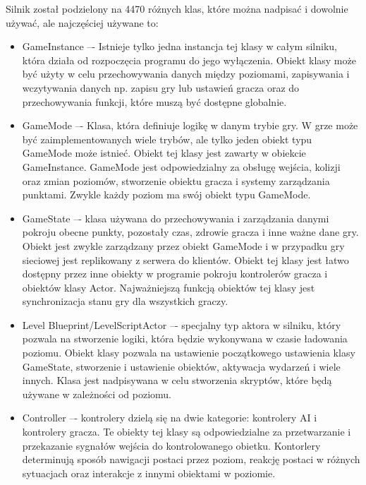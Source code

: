 \documentclass[12pt,twoside]{article}
\begin{document}
Silnik został podzielony na 4470 różnych klas, które można nadpisać i dowolnie
używać, ale najczęściej używane to:
\begin{itemize}
\item GameInstance –- Istnieje tylko jedna instancja tej klasy w całym silniku,
która działa od rozpoczęcia programu do jego wyłączenia. Obiekt klasy może być
użyty w celu przechowywania danych między poziomami, zapisywania i wczytywania
danych np. zapisu gry lub ustawień gracza oraz do przechowywania funkcji, które
muszą być dostępne globalnie.\cite{UE:GameInstance} 

\item GameMode –- Klasa, która definiuje logikę w danym trybie gry. W grze może
być zaimplementowanych wiele trybów, ale tylko jeden obiekt typu GameMode może
istnieć. Obiekt tej klasy jest zawarty w obiekcie GameInstance. GameMode jest
odpowiedzialny za obsługę wejścia, kolizji oraz zmian poziomów, stworzenie
obiektu gracza i systemy zarządzania punktami. Zwykle każdy poziom ma swój
obiekt typu GameMode.\cite{UE:GameModeState}

\item GameState –- klasa używana do przechowywania i zarządzania danymi pokroju
obecne punkty, pozostały czas, zdrowie gracza i inne ważne dane gry. Obiekt jest
zwykle zarządzany przez obiekt GameMode i w przypadku gry sieciowej jest
replikowany z serwera do klientów. Obiekt tej klasy jest łatwo dostępny przez
inne obiekty w programie pokroju kontrolerów gracza i obiektów klasy Actor.
Najważniejszą funkcją obiektów tej klasy jest synchronizacja stanu gry dla
wszystkich graczy.\cite{UE:GameModeState}

\item Level Blueprint/LevelScriptActor –- specjalny typ aktora w silniku, który
pozwala na stworzenie logiki, która będzie wykonywana w czasie ładowania
poziomu. Obiekt klasy pozwala na ustawienie początkowego ustawienia klasy
GameState, stworzenie i ustawienie obiektów, aktywacja wydarzeń i wiele innych.
Klasa jest nadpisywana w celu stworzenia skryptów, które będą używane w
zależności od poziomu.\cite{UE:LevelScriptActor}

\item Controller –- kontrolery dzielą się na dwie kategorie: kontrolery AI i
kontrolery gracza. Te obiekty tej klasy są odpowiedzialne za przetwarzanie i
przekazanie sygnałów wejścia do kontrolowanego obietku. Kontorlery determinują
sposób nawigacji postaci przez poziom, reakcję postaci w różnych sytuacjach oraz
interakcje z innymi obiektami w poziomie.\cite{UE:Controller}



\end{itemize}
\end{document}
